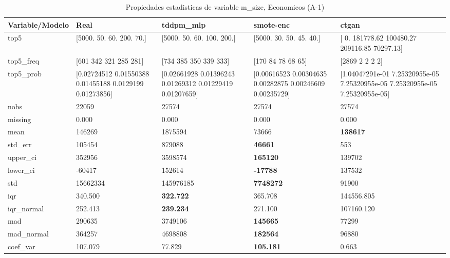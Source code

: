 \begin{table}[H]
\centering
\fontsize{8}{14}\selectfont
\caption{Propiedades  estadisticas de variable m\_size, Economicos (A-1)}
\label{table-stats-economicos-a-1-m_size}
\begin{tabular}{|l|m{10em}|m{10em}|m{10em}|m{10em}|}
\hline
 \rowcolor[gray]{0.8}
Variable/Modelo & Real & tddpm\_mlp & smote-enc & ctgan \\
\hline top5 & [5000.   50.   60.  200.   70.] & [5000.   50.   60.  100.  200.] & [5000.   30.   50.   45.   40.] & [     0.   181778.62 100480.27 209116.85  70297.13] \\
\hline top5\_freq & [601 342 321 285 281] & [734 385 350 339 333] & [170  84  78  68  65] & [2869    2    2    2    2] \\
\hline top5\_prob & [0.02724512 0.01550388 0.01455188 0.0129199  0.01273856] & [0.02661928 0.01396243 0.01269312 0.01229419 0.01207659] & [0.00616523 0.00304635 0.00282875 0.00246609 0.00235729] & [1.04047291e-01 7.25320955e-05 7.25320955e-05 7.25320955e-05
 7.25320955e-05] \\
\hline nobs & 22059 & 27574 & 27574 & 27574 \\
\hline missing & 0.000 & 0.000 & 0.000 & 0.000 \\
\hline mean & 146269 & \cellcolor[rgb]{0.9, 0.54, 0.52} 1875594 & 73666 & \bfseries 138617 \\
\hline std\_err & 105454 & \cellcolor[rgb]{0.9, 0.54, 0.52} 879088 & \bfseries 46661 & 553 \\
\hline upper\_ci & 352956 & \cellcolor[rgb]{0.9, 0.54, 0.52} 3598574 & \bfseries 165120 & 139702 \\
\hline lower\_ci & -60417 & \cellcolor[rgb]{0.9, 0.54, 0.52} 152614 & \bfseries -17788 & 137532 \\
\hline std & 15662334 & \cellcolor[rgb]{0.9, 0.54, 0.52} 145976185 & \bfseries 7748272 & 91900 \\
\hline iqr & 340.500 & \bfseries 322.722 & 365.708 & \cellcolor[rgb]{0.9, 0.54, 0.52} 144556.805 \\
\hline iqr\_normal & 252.413 & \bfseries 239.234 & 271.100 & \cellcolor[rgb]{0.9, 0.54, 0.52} 107160.120 \\
\hline mad & 290635 & \cellcolor[rgb]{0.9, 0.54, 0.52} 3749106 & \bfseries 145665 & 77299 \\
\hline mad\_normal & 364257 & \cellcolor[rgb]{0.9, 0.54, 0.52} 4698808 & \bfseries 182564 & 96880 \\
\hline coef\_var & 107.079 & 77.829 & \bfseries 105.181 & \cellcolor[rgb]{0.9, 0.54, 0.52} 0.663 \\

\end{tabular}
\end{table}
